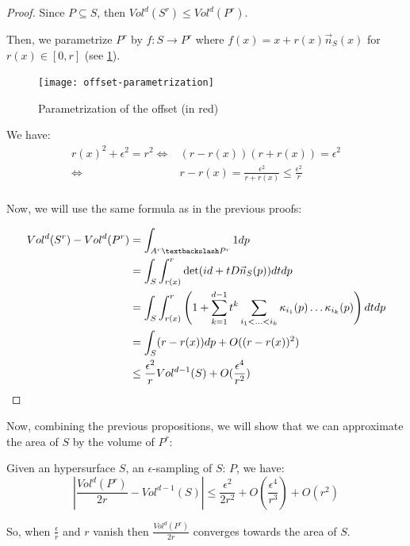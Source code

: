 \begin{proof}
    Since $ P \subseteq S $, then $ Vol^d(S^r) \leq Vol^d(P^r) $.

    Then, we parametrize $ P^r $ by $ f : S \rightarrow P^r $ where $ f(x) = x +
    r(x) \vec{n}_S(x) $ for $ r(x) \in [0, r] $ (see
    \ref{fig:offset-parametrization}).

    \begin{figure}[h]
        \centering
        \texttt{[image: offset-parametrization]}
        \caption{Parametrization of the offset (in red)}
        \label{fig:offset-parametrization}
    \end{figure}

    We have:
    \begin{align*}
        r(x)^2 + \epsilon^2 = r^2 \iff& (r - r(x)) (r + r(x)) = \epsilon^2 \\
        \iff& r - r(x) = \frac{\epsilon^2}{r + r(x)} \leq \frac{\epsilon^2}{r} \\
    \end{align*}

    Now, we will use the same formula as in the previous proofs:

    \begin{align*}
        Vol^d(S^r) - Vol^d(P^r) &= \int_{A^r \textbackslash P^r} 1 dp \\
        &= \int_S \int_{r(x)}^r \det(id + t D \vec{n}_S(p)) dt dp \\
        &= \int_S \int_{r(x)}^r \left( 1 + \sum_{k=1}^{d-1} t^k \sum_{i_1 < \ldots
                < i_k} \kappa_{i_1}(p) \ldots \kappa_{i_k}(p) \right) dt dp \\
        &= \int_S (r - r(x)) dp + O((r - r(x))^2) \\
        &\leq \frac{\epsilon^2}{r} Vol^{d-1}(S) + O(\frac{\epsilon^4}{r^2})
    \end{align*}
\end{proof}

Now, combining the previous propositions, we will show that we can approximate
the area of $ S $ by the volume of $ P^r $:

\begin{proposition}
    \label{prop:approx-volume-area}
    Given an hypersurface $ S $, an $\epsilon$-sampling of $ S $: $ P $, we
    have:
    $$ | \frac{Vol^d(P^r)}{2r} - Vol^{d-1}(S) | \leq \frac{\epsilon^2}{2r^2} +
    O(\frac{\epsilon^4}{r^3}) + O(r^2) $$

    So, when $ \frac{\epsilon}{r} $ and $ r $ vanish then $
    \frac{Vol^d(P^r)}{2r} $ converges towards the area of $ S $.
\end{proposition}

